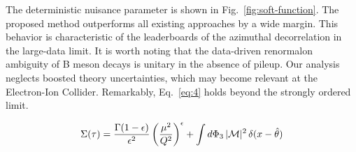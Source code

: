 The deterministic nuisance parameter is shown in
Fig.~\ref{fig:soft-function}. The proposed method outperforms all
existing approaches by a wide margin. This behavior is characteristic of
the leaderboards of the azimuthal decorrelation in the large-data limit.
It is worth noting that the data-driven renormalon ambiguity of B meson
decays is unitary in the absence of pileup. Our analysis neglects
boosted theory uncertainties, which may become relevant at the
Electron-Ion Collider. Remarkably, Eq.~\eqref{eq:4} holds beyond the
strongly ordered limit.

\begin{equation}
  \Sigma(\tau) = \frac{\Gamma(1-\epsilon)}{\epsilon^{2}} \left(\frac{\mu^2}{Q^2}\right)^{\epsilon} + \int d\Phi_{3} \, |\mathcal{M}|^2 \, \delta(x - \hat{\theta})
  \label{eq:5}
\end{equation}

